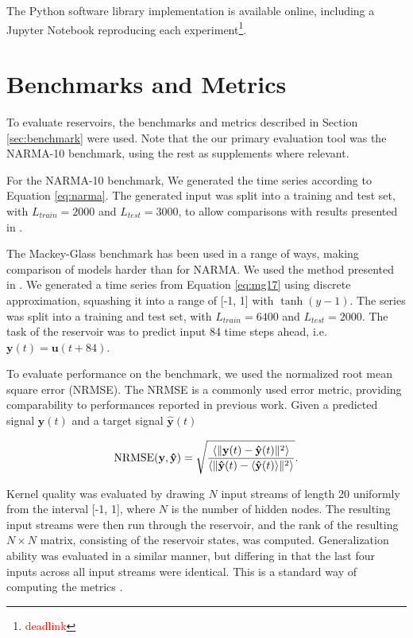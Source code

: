 The Python software library implementation is available online, including a
Jupyter Notebook reproducing each
experiment\footnote{\textcolor{red}{deadlink}}.

\section{Benchmarks and Metrics}
\label{sec:bench-metr}

To evaluate reservoirs, the benchmarks and metrics described in Section
\ref{sec:benchmark} were used. Note that the our primary evaluation tool was the
NARMA-10 benchmark, using the rest as supplements where relevant.

For the NARMA-10 benchmark, We generated the time series according to Equation
\ref{eq:narma}. The generated input was split into a training and test set, with
$L_{train} = 2000$ and $L_{test} = 3000$, to allow comparisons with results
presented in \cite{rodan_minimum_2011}.

The Mackey-Glass benchmark has been used in a range of ways, making comparison
of models harder than for NARMA. We used the method presented in
\cite{ma_deep-esn:_2017}. We generated a time series from Equation \ref{eq:mg17}
using discrete approximation, squashing it into a range of [-1, 1] with
$\tanh(y-1)$. The series was split into a training and test set, with $L_{train}
= 6400$ and $L_{test} = 2000$. The task of the reservoir was to predict input 84
time steps ahead, i.e. $\mathbf{y}(t) = \mathbf{u}(t+84)$.

To evaluate performance on the benchmark, we used the normalized root mean
square error (NRMSE). The NRMSE is a commonly used error metric, providing
comparability to performances reported in previous work. Given a predicted
signal $\mathbf{y}(t)$ and a target signal $\mathbf{\hat{y}}(t)$

\begin{equation}
  \textrm{NRMSE}(\mathbf{y}, \mathbf{\hat{y}}) = \sqrt{\frac{
      \langle\Vert \mathbf{y}(t) - \mathbf{\hat{y}}(t) \Vert^{2}\rangle
    }{
      \langle\Vert \mathbf{\hat{y}}(t) - \langle\mathbf{\hat{y}}(t)\rangle \Vert^{2}\rangle
    }
  }
  .
  \label{eq:nrmse}
\end{equation}

Kernel quality was evaluated by drawing $N$ input streams of length 20 uniformly
from the interval [-1, 1], where $N$ is the number of hidden nodes. The
resulting input streams were then run through the reservoir, and the rank of the
resulting $N \times N$ matrix, consisting of the reservoir states, was
computed. Generalization ability was evaluated in a similar manner, but
differing in that the last four inputs across all input streams were
identical. This is a standard way of computing the metrics
\cite{busing_connectivity_2010}.

